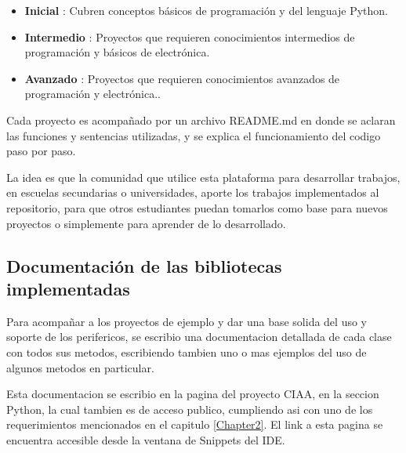 \begin{itemize}
	\item \textbf{Inicial} : Cubren conceptos básicos de programación y del lenguaje Python.
	\item \textbf{Intermedio} : Proyectos que requieren conocimientos intermedios de programación y básicos de electrónica.
	\item \textbf{Avanzado} : Proyectos que requieren conocimientos avanzados de programación y electrónica..	
\end{itemize}

Cada proyecto es acompañado por un archivo README.md en donde se aclaran las funciones y sentencias utilizadas, y se explica el funcionamiento del codigo paso por paso.

La idea es que la comunidad que utilice esta plataforma para desarrollar trabajos, en escuelas secundarias o universidades, aporte los trabajos implementados al repositorio, para que otros estudiantes puedan tomarlos como base para nuevos proyectos o simplemente para aprender de lo desarrollado.

\subsection{Documentación de las bibliotecas implementadas} 

Para acompañar a los proyectos de ejemplo y dar una base solida del uso y soporte de los perifericos, se escribio una documentacion detallada de cada clase con todos sus metodos, escribiendo tambien uno o mas ejemplos del uso de algunos metodos en particular.

Esta documentacion se escribio en la pagina del proyecto CIAA, en la seccion Python\cite{bibpython}, la cual tambien es de acceso publico, cumpliendo asi con uno de los requerimientos mencionados en el capitulo \ref{Chapter2}. El link a esta pagina se encuentra accesible desde la ventana de Snippets del IDE.








